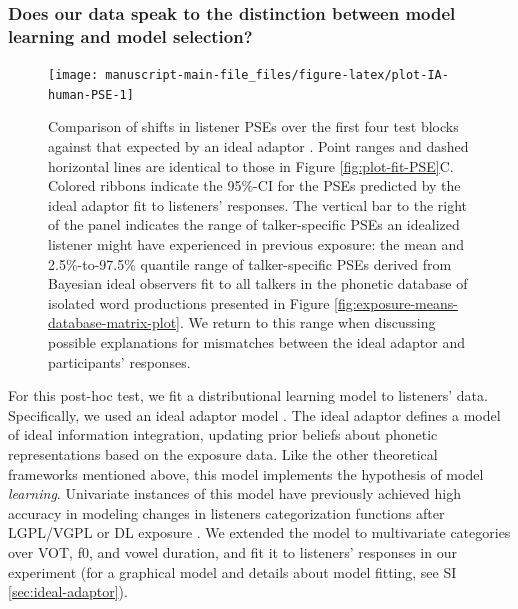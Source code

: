 \documentclass[
  11pt,
  man,mask,floatsintext]{apa6}
\begin{document}
\subsubsection{Does our data speak to the distinction between model learning and model selection?}\label{does-our-data-speak-to-the-distinction-between-model-learning-and-model-selection}



\begin{figure}[ht]

{\centering \texttt{[image: manuscript-main-file\_files/figure-latex/plot-IA-human-PSE-1]} 

}

\caption{Comparison of shifts in listener PSEs over the first four test blocks against that expected by an ideal adaptor \autocite[a distributional learning model that describes ideal information integration,][]{kleinschmidt-jaeger2015}. Point ranges and dashed horizontal lines are identical to those in Figure \ref{fig:plot-fit-PSE}C. Colored ribbons indicate the 95\%-CI for the PSEs predicted by the ideal adaptor fit to listeners' responses. The vertical bar to the right of the panel indicates the range of talker-specific PSEs an idealized listener might have experienced in previous exposure: the mean and 2.5\%-to-97.5\% quantile range of talker-specific PSEs derived from Bayesian ideal observers fit to all talkers in the phonetic database of isolated word productions presented in Figure \ref{fig:exposure-means-database-matrix-plot}. We return to this range when discussing possible explanations for mismatches between the ideal adaptor and participants' responses.}\label{fig:plot-IA-human-PSE}
\end{figure}

For this post-hoc test, we fit a distributional learning model to listeners' data. Specifically, we used an ideal adaptor model \autocite{kleinschmidt-jaeger2015,kleinschmidt-jaeger2016}. The ideal adaptor defines a model of ideal information integration, updating prior beliefs about phonetic representations based on the exposure data. Like the other theoretical frameworks mentioned above, this model implements the hypothesis of model \emph{learning}. Univariate instances of this model have previously achieved high accuracy in modeling changes in listeners categorization functions after LGPL/VGPL \autocites[for /s/-//,][]{cummings-theodore2023}[/b/-/d/,][]{kleinschmidt-jaeger2011,kleinschmidt-jaeger2012} or DL exposure \autocites[for /b/-/p/,][]{kleinschmidt2020,kleinschmidt-jaeger2016}[/g/-/k/,][]{theodore-monto2019}. We extended the model to multivariate categories over VOT, f0, and vowel duration, and fit it to listeners' responses in our experiment (for a graphical model and details about model fitting, see SI \ref{sec:ideal-adaptor}).
\end{document}
